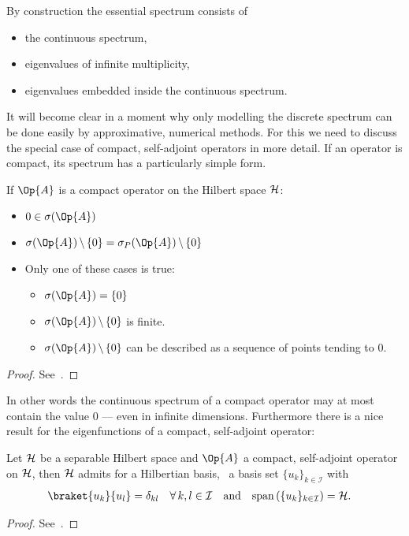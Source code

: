 \noindent
By construction the essential spectrum consists of
\begin{itemize}
	\item the continuous spectrum,
	\item eigenvalues of infinite multiplicity,
	\item eigenvalues embedded inside the continuous spectrum.
\end{itemize}
It will become clear in a moment
why only modelling the discrete spectrum can be done easily by
approximative, numerical methods.
For this we need to discuss the special case of
compact, self-adjoint operators in more detail.
If an operator is compact,
its spectrum has a particularly simple form.
\begin{prop}
	\label{prop:CompactSpectrum}
	If $\Op{A}$ is a compact operator on the Hilbert space $\mathcal{H}$:
	\begin{itemize}
		\item $0 \in \sigma(\Op{A})$
		\item $\sigma(\Op{A}) \, \backslash \, \{0\}
			= \sigma_P(\Op{A}) \, \backslash \, \{0\}$
		\item Only one of these cases is true:
			\begin{itemize}
				\item[\textopenbullet] $\sigma(\Op{A}) = \{0\}$
				\item[\textopenbullet] $\sigma(\Op{A}) \, \backslash \, \{0\}$ is finite.
				\item[\textopenbullet]
					$\sigma(\Op{A}) \, \backslash \, \{0\}$ can be described
					as a sequence of points tending to $0$.
			\end{itemize}
	\end{itemize}
	\begin{proof}
		See~\cite[p.~56]{Helffer2013}.
	\end{proof}
\end{prop}
In other words the continuous spectrum of a compact operator
may at most contain the value $0$ --- even in infinite dimensions.
Furthermore there is a nice result for the eigenfunctions of a compact, self-adjoint
operator:
\begin{prop}
	\label{prop:CompactBasis}
	Let $\mathcal{H}$ be a separable Hilbert space and $\Op{A}$ a compact,
	self-adjoint operator on $\mathcal{H}$,
	then $\mathcal{H}$ admits for a Hilbertian basis,
	\ie~a basis set $\{ u_k \}_{k \in \mathcal{I}}$ with
	\begin{align*}
	\braket{u_k}{u_l} &= \delta_{kl} \quad \forall \, k,l \in \mathcal{I}
	&&\text{and}&
	\spacespan \left( \{ u_k \}_{k \in \mathcal{I}} \right) &= \hilbert.
	\end{align*}
	\begin{proof}
		See~\cite[p.~60]{Helffer2013}.
	\end{proof}
\end{prop}

